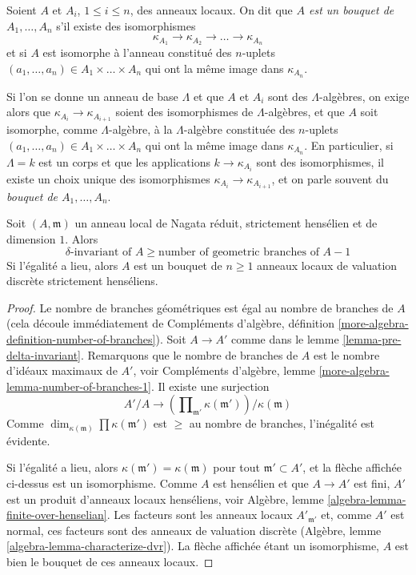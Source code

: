 \begin{definition}
\label{definition-wedge}
Soient $A$ et $A_i$, $1 \leq i \leq n$, des anneaux locaux. On dit
que {\it $A$ est un bouquet de $A_1, \ldots, A_n$}
s'il existe des isomorphismes
$$
\kappa_{A_1} \to \kappa_{A_2} \to \ldots \to \kappa_{A_n}
$$
et si $A$ est isomorphe à l'anneau constitué des $n$-uplets
$(a_1, \ldots, a_n) \in A_1 \times \ldots \times A_n$ qui ont la
même image dans $\kappa_{A_n}$.
\end{definition}

\noindent
Si l'on se donne un anneau de base $\Lambda$ et que $A$ et $A_i$ sont des $\Lambda$-algèbres,
on exige alors que $\kappa_{A_i} \to \kappa_{A_{i + 1}}$
soient des isomorphismes de $\Lambda$-algèbres,
et que $A$ soit isomorphe, comme $\Lambda$-algèbre, à la $\Lambda$-algèbre
constituée des $n$-uplets
$(a_1, \ldots, a_n) \in A_1 \times \ldots \times A_n$ qui ont la
même image dans $\kappa_{A_n}$. En particulier, si $\Lambda = k$ est un corps
et que les applications $k \to \kappa_{A_i}$ sont des isomorphismes, il existe
un choix unique des isomorphismes
$\kappa_{A_i} \to \kappa_{A_{i + 1}}$, et
on parle souvent du {\it bouquet de $A_1, \ldots, A_n$}.

\begin{lemma}
\label{lemma-delta-number-branches-inequality-sh}
Soit $(A, \mathfrak m)$ un anneau local de Nagata réduit,
strictement hensélien et de dimension $1$. Alors
$$
\delta\text{-invariant of }A \geq \text{number of geometric branches of }A - 1
$$
Si l'égalité a lieu, alors $A$ est un bouquet de $n \geq 1$ anneaux locaux
de valuation discrète strictement henséliens.
\end{lemma}

\begin{proof}
Le nombre de branches géométriques est égal au nombre de branches de $A$
(cela découle immédiatement de
Compléments d'algèbre, définition \ref{more-algebra-definition-number-of-branches}).
Soit $A \to A'$ comme dans le lemme \ref{lemma-pre-delta-invariant}.
Remarquons que le nombre de branches de $A$ est le nombre
d'idéaux maximaux de $A'$, voir
Compléments d'algèbre, lemme \ref{more-algebra-lemma-number-of-branches-1}.
Il existe une surjection
$$
A'/A \longrightarrow
\left(\prod\nolimits_{\mathfrak m'} \kappa(\mathfrak m')\right)/
\kappa(\mathfrak m)
$$
Comme $\dim_{\kappa(\mathfrak m)} \prod \kappa(\mathfrak m')$
est $\geq$ au nombre de branches, l'inégalité est évidente.

\medskip\noindent
Si l'égalité a lieu, alors $\kappa(\mathfrak m') = \kappa(\mathfrak m)$
pour tout $\mathfrak m' \subset A'$, et la flèche affichée ci-dessus
est un isomorphisme. Comme $A$ est hensélien et que
$A \to A'$ est fini, $A'$ est un produit d'anneaux locaux
henséliens, voir Algèbre, lemme \ref{algebra-lemma-finite-over-henselian}.
Les facteurs sont les anneaux locaux $A'_{\mathfrak m'}$ et, comme
$A'$ est normal, ces facteurs sont des anneaux de valuation discrète
(Algèbre, lemme \ref{algebra-lemma-characterize-dvr}).
La flèche affichée étant un isomorphisme,
$A$ est bien le bouquet de ces anneaux locaux.
\end{proof}

